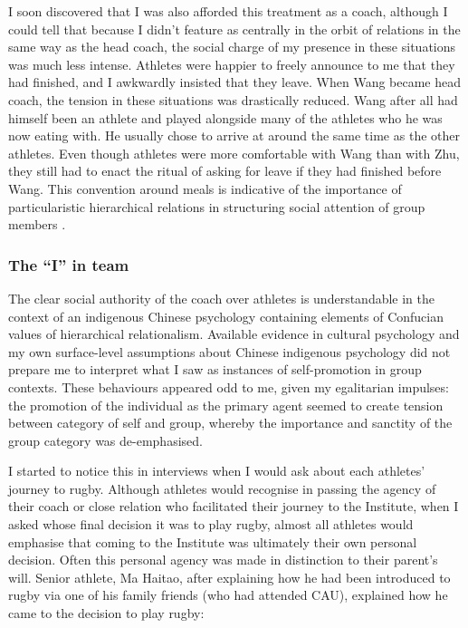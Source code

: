 \begin{CJK}{UTF8}{gbsn}
I soon discovered that I was also afforded this treatment as a coach, although I could tell that because I didn't feature as centrally in the orbit of relations in the same way as the head coach, the social charge of my presence in these situations was much less intense.  Athletes were happier to freely announce to me that they had finished, and I awkwardly insisted that they leave.  When Wang became head coach, the tension in these situations was drastically reduced. Wang after all had himself been an athlete and played alongside many of the athletes who he was now eating with.  He usually chose to arrive at around the same time as the other athletes.  Even though athletes were more comfortable with Wang than with Zhu, they still had to enact the ritual of asking for leave if they had finished before Wang.  This convention around meals is indicative of the importance of particularistic hierarchical relations in structuring social attention of group members \citep{Liu2009}.

\subsubsection{The ``I'' in team \label{sect:IinTeam}}
The clear social authority of the coach over athletes is understandable in the context of an indigenous Chinese psychology containing elements of Confucian values of hierarchical relationalism.
Available evidence in cultural psychology and my own surface-level assumptions about Chinese indigenous psychology did not prepare me to interpret what I saw as instances of self-promotion in group contexts.  These behaviours appeared odd to me, given my egalitarian impulses: the promotion of the individual as the primary agent seemed to create tension between category of self and group, whereby the importance and sanctity of the group category was de-emphasised.

I started to notice this in interviews when I would ask about each athletes' journey to rugby.  Although athletes would recognise in passing the agency of their coach or close relation who facilitated their journey to the Institute, when I asked whose final decision it was to play rugby, almost all athletes would emphasise that coming to the Institute was ultimately their own personal decision.  Often this personal agency was made in distinction to their parent's will.  Senior athlete, Ma Haitao, after explaining how he had been introduced to rugby via one of his family friends (who had attended CAU), explained how he came to the decision to play rugby:


\end{CJK}
